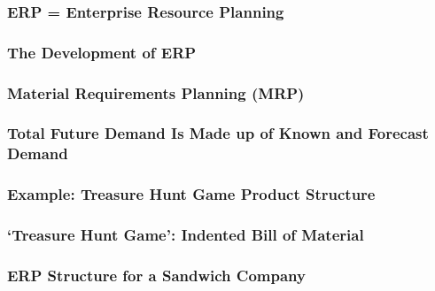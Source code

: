 \subsubsection{ERP = Enterprise Resource Planning}
\subsubsection{The Development of ERP}
\subsubsection{Material Requirements Planning (MRP)}
\subsubsection{Total Future Demand Is Made up of Known and Forecast Demand}
\subsubsection{Example: Treasure Hunt Game Product Structure}
\subsubsection{‘Treasure Hunt Game’: Indented Bill of Material}
\subsubsection{ERP Structure for a Sandwich Company}
